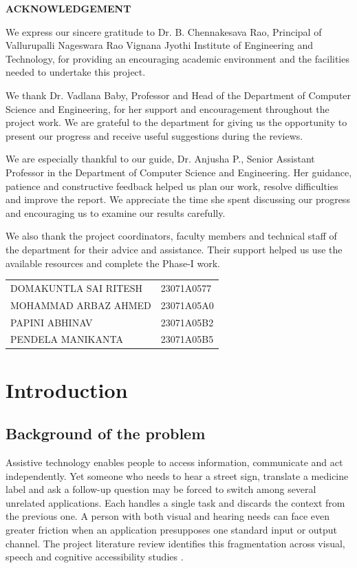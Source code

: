 \documentclass[12pt,a4paper,oneside]{report}
\makeatletter
\newcommand{\studentlist}{%
\begin{tabular}{@{}p{3.4in}l@{}}
DOMAKUNTLA SAI RITESH & 23071A0577\\
MOHAMMAD ARBAZ AHMED & 23071A05A0\\
PAPINI ABHINAV & 23071A05B2\\
PENDELA MANIKANTA & 23071A05B5
\end{tabular}}
\newcommand{\frontheading}[1]{\begin{center}\color{frontnavy}\bfseries\large #1\end{center}\vspace{0.5cm}}
\newcommand{\frontpage}[2]{\clearpage\phantomsection\addcontentsline{toc}{chapter}{#1}\frontheading{#1}#2}
\makeatother
\begin{document}
\frontpage{ACKNOWLEDGEMENT}{
We express our sincere gratitude to Dr. B. Chennakesava Rao, Principal of Vallurupalli Nageswara Rao Vignana Jyothi Institute of Engineering and Technology, for providing an encouraging academic environment and the facilities needed to undertake this project.

We thank Dr. Vadlana Baby, Professor and Head of the Department of Computer Science and Engineering, for her support and encouragement throughout the project work. We are grateful to the department for giving us the opportunity to present our progress and receive useful suggestions during the reviews.

We are especially thankful to our guide, Dr. Anjusha P., Senior Assistant Professor in the Department of Computer Science and Engineering. Her guidance, patience and constructive feedback helped us plan our work, resolve difficulties and improve the report. We appreciate the time she spent discussing our progress and encouraging us to examine our results carefully.

We also thank the project coordinators, faculty members and technical staff of the department for their advice and assistance. Their support helped us use the available resources and complete the Phase-I work.

\vspace{0.9in}
\begin{center}{\bfseries\studentlist}\end{center}
}

\clearpage{}
\chapter{Introduction}
\section{Background of the problem}
Assistive technology enables people to access information, communicate and act independently. Yet someone who needs to hear a street sign, translate a medicine label and ask a follow-up question may be forced to switch among several unrelated applications. Each handles a single task and discards the context from the previous one. A person with both visual and hearing needs can face even greater friction when an application presupposes one standard input or output channel. The project literature review identifies this fragmentation across visual, speech and cognitive accessibility studies \cite{rajagopal,aljedaani,jan}.
\end{document}
